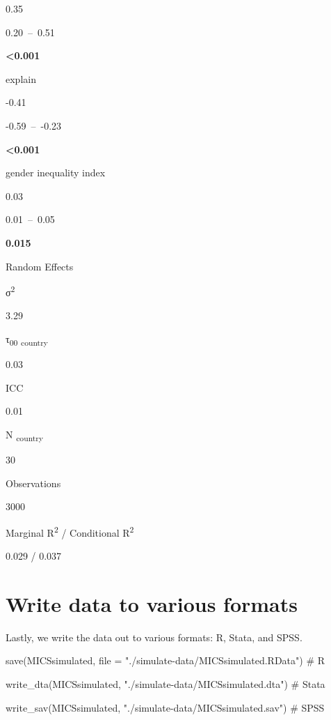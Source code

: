 \documentclass[
  letterpaper,
  DIV=11,
  numbers=noendperiod]{scrreprt}
\newenvironment{Shaded}{\begin{snugshade}}{\end{snugshade}}
\newcommand{\AttributeTok}[1]{\textcolor[rgb]{0.40,0.45,0.13}{#1}}
\newcommand{\CommentTok}[1]{\textcolor[rgb]{0.37,0.37,0.37}{#1}}
\newcommand{\FunctionTok}[1]{\textcolor[rgb]{0.28,0.35,0.67}{#1}}
\newcommand{\NormalTok}[1]{\textcolor[rgb]{0.00,0.23,0.31}{#1}}
\newcommand{\StringTok}[1]{\textcolor[rgb]{0.13,0.47,0.30}{#1}}
\begin{document}
0.35

0.20~--~0.51

\textbf{\textless0.001}

explain

-0.41

-0.59~--~-0.23

\textbf{\textless0.001}

gender inequality index

0.03

0.01~--~0.05

\textbf{0.015}

Random Effects

σ\textsuperscript{2}

3.29

τ\textsubscript{00} \textsubscript{country}

0.03

ICC

0.01

N \textsubscript{country}

30

Observations

3000

Marginal R\textsuperscript{2} / Conditional R\textsuperscript{2}

0.029 / 0.037

\hypertarget{write-data-to-various-formats}{%
\section{Write data to various
formats}\label{write-data-to-various-formats}}

Lastly, we write the data out to various formats: R, Stata, and SPSS.

\begin{Shaded}
\begin{Highlighting}[]
\FunctionTok{save}\NormalTok{(MICSsimulated, }
     \AttributeTok{file =} \StringTok{"./simulate{-}data/MICSsimulated.RData"}\NormalTok{) }\CommentTok{\# R}

\FunctionTok{write\_dta}\NormalTok{(MICSsimulated, }
          \StringTok{"./simulate{-}data/MICSsimulated.dta"}\NormalTok{) }\CommentTok{\# Stata}

\FunctionTok{write\_sav}\NormalTok{(MICSsimulated, }
          \StringTok{"./simulate{-}data/MICSsimulated.sav"}\NormalTok{) }\CommentTok{\# SPSS}
\end{Highlighting}
\end{Shaded}
\end{document}
